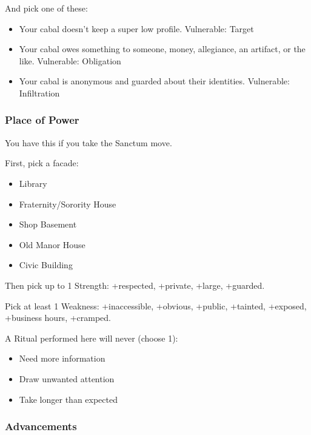 \documentclass[
]{article}
\providecommand{\tightlist}{%
  \setlength{\itemsep}{0pt}\setlength{\parskip}{0pt}}
\begin{document}
And pick one of these:

\begin{itemize}
\tightlist
\item
  Your cabal doesn't keep a super low profile. Vulnerable: Target
\item
  Your cabal owes something to someone, money, allegiance, an artifact,
  or the like. Vulnerable: Obligation
\item
  Your cabal is anonymous and guarded about their identities.
  Vulnerable: Infiltration
\end{itemize}

\hypertarget{place-of-power}{%
\subsubsection{Place of Power}\label{place-of-power}}

You have this if you take the Sanctum move.

First, pick a facade:

\begin{itemize}
\tightlist
\item
  Library
\item
  Fraternity/Sorority House
\item
  Shop Basement
\item
  Old Manor House
\item
  Civic Building
\end{itemize}

Then pick up to 1 Strength: +respected, +private, +large, +guarded.

Pick at least 1 Weakness: +inaccessible, +obvious, +public, +tainted,
+exposed, +business hours, +cramped.

A Ritual performed here will never (choose 1):

\begin{itemize}
\tightlist
\item
  Need more information
\item
  Draw unwanted attention
\item
  Take longer than expected
\end{itemize}

\hypertarget{advancements}{%
\subsubsection{Advancements}\label{advancements}}
\end{document}
